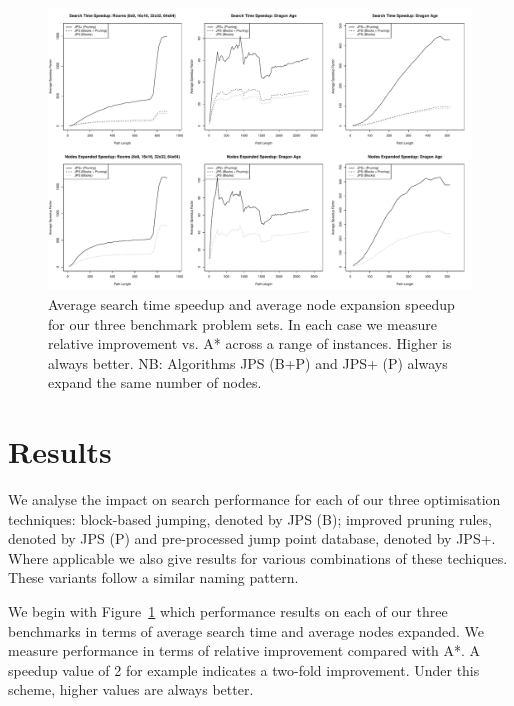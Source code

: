 \begin{figure}[tb]
       \begin{center}
		   \includegraphics[width=0.95\columnwidth, trim = 0mm 0mm 0mm 0mm]
			{diagrams/speedup.pdf}
       \end{center}
\caption{Average search time speedup and average node expansion speedup for our three benchmark problem sets. In each case we measure relative improvement vs. A* 
across a range of instances. Higher is always better. NB: Algorithms JPS (B+P) and JPS+ (P) always expand the same number of nodes. }
\label{fig::speedup}
\end{figure}

\section{Results}
\label{sec::results}

We analyse the impact on search performance for each of our three optimisation techniques:
block-based jumping, denoted by JPS (B); improved pruning rules, denoted by JPS (P) and 
pre-processed jump point database, denoted by JPS+.
Where applicable we also give results for various combinations of these techiques. These 
variants follow a similar naming pattern.

We begin with Figure~\ref{fig::speedup} which performance results on each of our three
benchmarks in terms of average search time and average nodes expanded. We measure performance
in terms of relative improvement compared with A*. A speedup value of 2 for example indicates 
a two-fold improvement. Under this scheme, higher values are always better.

